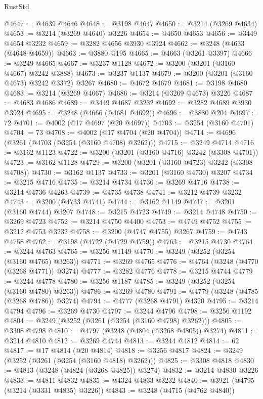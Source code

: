 \begin{lexlean}{RustStd}
\begin{coremodule}
@4647 := @4639 @4646
@4648 := @3198 @4647
@4650 := @3214 (@3269 @4634)
@4653 := @3214 (@3269 @4640) @3226
@4654 := @4650 @4653
@4656 := @3449 @4654 @3232
@4659 := @3282 @4656 @3930 @3924
@4662 := @3248 (@4633 (@4648 @4659))
@4663 := @3880 @195
@4665 := @4663 (@3261 @3397)
@4666 := @3249 @4665
@4667 := @3237 @1128
@4672 := @3200 (@3201 (@3160 @4667) @3242 @3888)
@4673 := @3237 @1137
@4679 := @3200 (@3201 (@3160 @4673) @3242 @3372) @3267
@4680 := @4672 @4679
@4681 := @3198 @4680
@4683 := @3214 (@3269 @4667)
@4686 := @3214 (@3269 @4673) @3226
@4687 := @4683 @4686
@4689 := @3449 @4687 @3232
@4692 := @3282 @4689 @3930 @3924
@4695 := @3248 (@4666 (@4681 @4692))
@4696 := @3880 @204
@4697 := 72
@4701 := @4002 (@17 @4697 (@20 @4697))
@4703 := @3254 (@3160 @4701)
@4704 := 73
@4708 := @4002 (@17 @4704 (@20 @4704))
@4714 := @4696 (@3261 (@4703 (@3254 (@3160 @4708) @3262)))
@4715 := @3249 @4714
@4716 := @3162 @1123
@4722 := @3200 (@3201 (@3160 @4716) @3242 (@3308 @4701))
@4723 := @3162 @1128
@4729 := @3200 (@3201 (@3160 @4723) @3242 (@3308 @4708))
@4730 := @3162 @1137
@4733 := @3201 (@3160 @4730) @3207
@4734 := @3215 @4716
@4735 := @3214 @4734
@4736 := @3269 @4716
@4738 := @3214 @4736 @4263
@4739 := @4735 @4738
@4741 := @3212 @4739 @3232
@4743 := @3200 (@4733 @4741)
@4744 := @3162 @1149
@4747 := @3201 (@3160 @4744) @3207
@4748 := @3215 @4723
@4749 := @3214 @4748
@4750 := @3269 @4723
@4752 := @3214 @4750 @4400
@4753 := @4749 @4752
@4755 := @3212 @4753 @3232
@4758 := @3200 (@4747 @4755) @3267
@4759 := @4743 @4758
@4762 := @3198 (@4722 (@4729 @4759))
@4763 := @3215 @4730
@4764 := @3244 @4763
@4765 := @3256 @1149
@4770 := @3249 (@3252 (@3254 (@3160 @4765) @3263))
@4771 := @3269 @4765
@4776 := @4764 (@3248 (@4770 (@3268 @4771)) @3274)
@4777 := @3282 @4776
@4778 := @3215 @4744
@4779 := @3244 @4778
@4780 := @3256 @1187
@4785 := @3249 (@3252 (@3254 (@3160 @4780) @3263))
@4786 := @3269 @4780
@4791 := @4779 (@3248 (@4785 (@3268 @4786)) @3274)
@4794 := @4777 (@3268 @4791) @4320
@4795 := @3214 @4794
@4796 := @3269 @4730
@4797 := @3244 @4796
@4798 := @3256 @1192
@4804 := @3249 (@3252 (@3261 (@3254 (@3160 @4798) @3262)))
@4805 := @3308 @4798
@4810 := @4797 (@3248 (@4804 (@3268 @4805)) @3274)
@4811 := @3214 @4810
@4812 := @3269 @4744
@4813 := @3244 @4812
@4814 := 62
@4817 := @17 @4814 (@20 @4814)
@4818 := @3256 @4817
@4824 := @3249 (@3252 (@3261 (@3254 (@3160 @4818) @3262)))
@4825 := @3308 @4818
@4830 := @4813 (@3248 (@4824 (@3268 @4825)) @3274)
@4832 := @3214 @4830 @3226
@4833 := @4811 @4832
@4835 := @4324 @4833 @3232
@4840 := @3921 (@4795 (@3214 (@3331 @4835) @3226))
@4843 := @3248 (@4715 (@4762 @4840))

\end{coremodule}
\end{lexlean}
